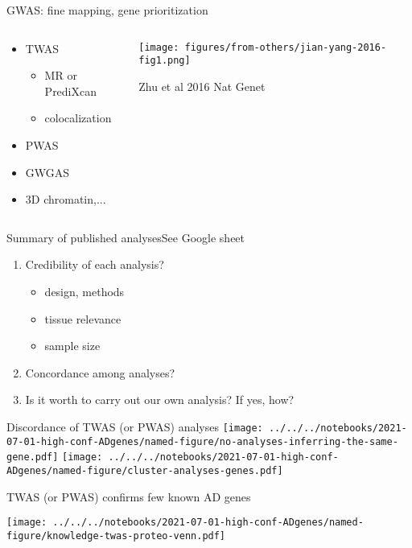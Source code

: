 \documentclass[aspectratio=169]{beamer}
\begin{document}
\begin{frame}{GWAS: fine mapping, gene prioritization}
\begin{columns}[t]
\begin{column}{0.4\textwidth}
\begin{itemize}
\item TWAS
\begin{itemize}
\item MR or PrediXcan
\item colocalization
\end{itemize}
\item PWAS
\item GWGAS
\item 3D chromatin,...
\end{itemize}
\end{column}

\begin{column}{0.7\textwidth}

\texttt{[image: figures/from-others/jian-yang-2016-fig1.png]}

{\tiny Zhu et al 2016 Nat Genet}
\end{column}
\end{columns}
\end{frame}

\begin{frame}{Summary of published analyses}{See Google sheet}
\begin{enumerate}
\item Credibility of each analysis?
\begin{itemize}
	\item design, methods
	\item tissue relevance
	\item sample size
\end{itemize}
\item Concordance among analyses?
\item Is it worth to carry out our own analysis?  If yes, how?
\end{enumerate}
\end{frame}

\begin{frame}{Discordance of TWAS (or PWAS) analyses}
\texttt{[image: ../../../notebooks/2021-07-01-high-conf-ADgenes/named-figure/no-analyses-inferring-the-same-gene.pdf]}
\texttt{[image: ../../../notebooks/2021-07-01-high-conf-ADgenes/named-figure/cluster-analyses-genes.pdf]}
\end{frame}

\begin{frame}{TWAS (or PWAS) confirms few known AD genes}
\begin{center}
\texttt{[image: ../../../notebooks/2021-07-01-high-conf-ADgenes/named-figure/knowledge-twas-proteo-venn.pdf]}
\end{center}
\end{frame}
\end{document}
